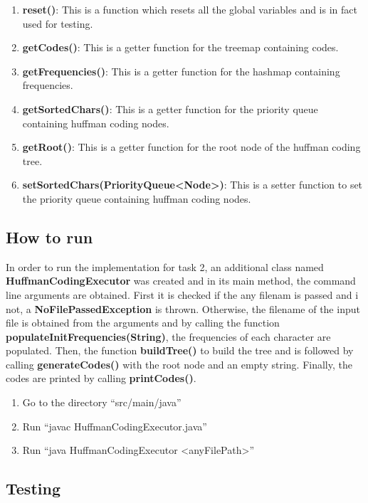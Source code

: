 \documentclass{article}
\newcommand{\quotes}[1]{``#1''}
\begin{document}
\begin{enumerate}
				\item \textbf{reset()}: This is a function which resets all the global variables and is in fact used for testing.
				
				\item \textbf{getCodes()}: This is a getter function for the treemap containing codes.
				\item \textbf{getFrequencies()}: This is a getter function for the hashmap containing frequencies.
				\item \textbf{getSortedChars()}: This is a getter function for the priority queue containing huffman coding nodes.
				\item \textbf{getRoot()}: This is a getter function for the root node of the huffman coding tree.
				\item \textbf{setSortedChars(PriorityQueue\textless Node\textgreater)}: This is a setter function to set the priority queue containing huffman coding nodes.
				
				

		\end{enumerate}
		
		\subsection{How to run}

In order to run the implementation for task 2, an additional class named \textbf{HuffmanCodingExecutor} was created and in its main method, the command line arguments are obtained. First it is checked if the any filenam is passed and i not, a \textbf{NoFilePassedException} is thrown. Otherwise, the filename of the input file is obtained from the arguments and by calling the function \textbf{populateInitFrequencies(String)}, the frequencies of each character are populated. Then, the function \textbf{buildTree()} to build the tree and is followed by calling \textbf{generateCodes()} with the root node and an empty string. Finally, the codes are printed by calling \textbf{printCodes()}.

\begin{enumerate}
\item Go to the directory \quotes{src/main/java}
\item Run \quotes{javac HuffmanCodingExecutor.java}
\item Run \quotes{java HuffmanCodingExecutor \textless anyFilePath\textgreater}
\end{enumerate}

		\subsection{Testing}
\end{document}

